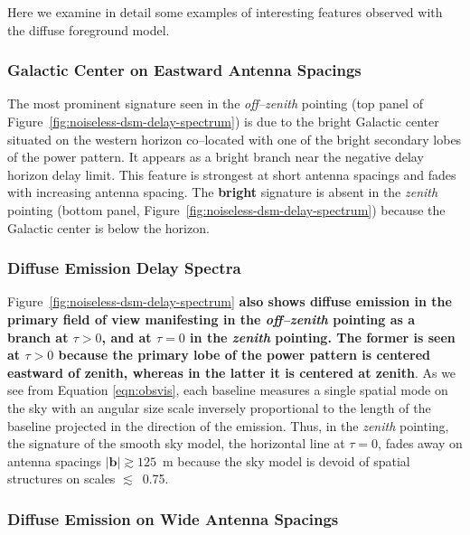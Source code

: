 \documentclass[preprint2,iop,numberedappendix]{emulateapj}
\begin{document}
Here we examine in detail some examples of interesting features observed with the diffuse foreground model.

\subsubsection{Galactic Center on Eastward Antenna Spacings}\label{sec:GC-east}

The most prominent signature seen in the {\it off--zenith} pointing (top panel of Figure~\ref{fig:noiseless-dsm-delay-spectrum}) is due to the bright Galactic center situated on the western horizon co--located with one of the bright secondary lobes of the power pattern. It appears as a bright branch near the negative delay horizon delay limit. This feature is strongest at short antenna spacings and fades with increasing antenna spacing. The {\bf bright} signature is absent in the {\it zenith} pointing (bottom panel, Figure~\ref{fig:noiseless-dsm-delay-spectrum}) because the Galactic center is below the horizon. 

\subsubsection{Diffuse Emission Delay Spectra}\label{sec:diffuse-features}

Figure~\ref{fig:noiseless-dsm-delay-spectrum} {\bf also shows diffuse emission in the primary field of view manifesting in the {\it off--zenith} pointing as a branch at $\tau>0$, and at $\tau=0$ in the {\it zenith} pointing. The former is seen at $\tau>0$ because the primary lobe of the power pattern is centered eastward of zenith, whereas in the latter it is centered at zenith}. As we see from Equation \ref{eqn:obsvis}, each baseline measures a single spatial mode on the sky with an angular size scale inversely proportional to the length of the baseline projected in the direction of the emission. Thus, in the {\it zenith} pointing, the signature of the smooth sky model, the horizontal line at $\tau=0$, fades away on antenna spacings $|\boldsymbol{b}| \gtrsim 125$~m because the sky model is devoid of spatial structures on scales $\lesssim$~0.75\arcdeg. 

\subsubsection{Diffuse Emission on Wide Antenna Spacings}\label{sec:diffuse-long-baselines}
\end{document}
